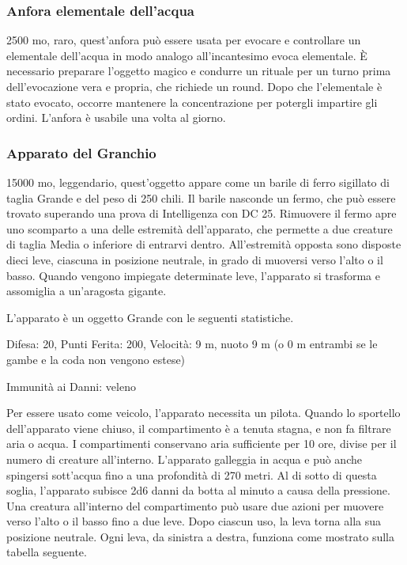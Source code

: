 \begin{multicols}{2}
	\subsubsection*{Anfora elementale dell’acqua}
	2500 mo, raro, quest'anfora può essere usata per evocare e controllare un elementale dell’acqua in modo analogo all’incantesimo evoca elementale. È necessario preparare l'oggetto magico e condurre un rituale per un turno prima dell’evocazione vera e propria, che richiede un round. Dopo che l’elementale è stato evocato, occorre mantenere la concentrazione per potergli impartire gli ordini. L'anfora è usabile una volta al giorno.

	\subsubsection*{Apparato del Granchio}
	15000 mo, leggendario, quest'oggetto appare come un barile di ferro sigillato di taglia Grande e del peso di 250 chili. Il barile nasconde un fermo, che può essere trovato superando una prova di Intelligenza con DC 25. Rimuovere il fermo apre uno scomparto a una delle estremità dell'apparato, che permette a due creature di taglia Media o inferiore di entrarvi dentro. All'estremità opposta sono disposte dieci leve, ciascuna in posizione neutrale, in grado di muoversi verso l'alto o il basso. Quando vengono impiegate determinate leve, l'apparato si trasforma e assomiglia a un'aragosta gigante.

	L'apparato è un oggetto Grande con le seguenti statistiche.

	Difesa: 20, Punti Ferita: 200, Velocità: 9 m, nuoto 9 m (o 0 m entrambi se le gambe e la coda non vengono estese)

	Immunità ai Danni: veleno

	Per essere usato come veicolo, l'apparato necessita un pilota. Quando lo sportello dell'apparato viene chiuso, il compartimento è a tenuta stagna, e non fa filtrare aria o acqua. I compartimenti conservano aria sufficiente per 10 ore, divise per il numero di creature all'interno. L'apparato galleggia in acqua e può anche spingersi sott'acqua fino a una profondità di 270 metri. Al di sotto di questa soglia, l'apparato subisce 2d6 danni da botta al minuto a causa della pressione. Una creatura all'interno del compartimento può usare due azioni per muovere verso l'alto o il basso fino a due leve. Dopo ciascun uso, la leva torna alla sua posizione neutrale. Ogni leva, da sinistra a destra, funziona come mostrato sulla tabella seguente.


\end{multicols}
